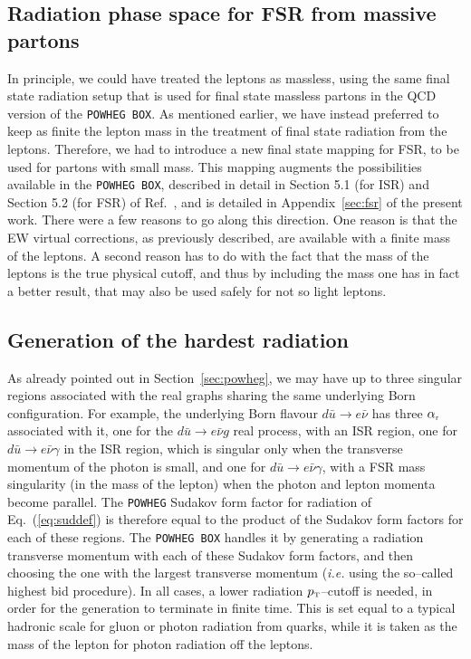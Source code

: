 \documentclass[11pt,a4paper]{article}
\newcommand\sss{\mathchoice%
{\displaystyle}%
{\scriptstyle}%
{\scriptscriptstyle}%
{\scriptscriptstyle}%
}
\newcommand\frindsing{{\ctindr}}
\newcommand\ctindr{{\alpha_{\sss\rm r}}}
\newcommand\pt{p_{\sss\rm T}}
\newcommand\POWHEGBOX{\texttt{POWHEG BOX}}
\newcommand\POWHEG{\texttt{POWHEG}}
\begin{document}
\subsection{Radiation phase space for FSR from massive partons}
\label{sec:fsrs}
In principle, we could have treated
the leptons as massless, using the same final state radiation
setup that is used for final state massless partons in the 
QCD version of the \POWHEGBOX{}. As mentioned earlier,
we have instead preferred to keep as finite the lepton mass in the 
treatment of final state
radiation from the leptons. Therefore, we had to introduce a new
final state mapping for FSR, to be used for 
partons with small mass. This mapping augments the possibilities
available in the \POWHEGBOX{}, described in detail in 
Section 5.1 (for ISR) and Section 5.2 (for FSR) of Ref.~\cite{Frixione:2007vw},
and is detailed in Appendix~\ref{sec:fsr} of the present work.
There were a few reasons to go along this direction. One reason
is that the EW virtual corrections, as previously described, are available with a finite mass of the
leptons. A second reason has to do with the fact
that the mass of the leptons is the true physical cutoff, and thus by
including the mass one has in fact a better result, that may
also be used safely for not so light leptons.
\subsection{Generation of the hardest radiation}
\label{sec:interface}
As already pointed out in Section~\ref{sec:powheg}, we may have up to three singular regions
associated with the real graphs sharing the same underlying
Born configuration. For example, the underlying Born flavour
$d\bar{u}\to e \bar\nu$ has three $\frindsing$ associated
with it, one for the $d\bar{u}\to e \bar\nu g$ real process,
with an ISR region, one for $d\bar{u}\to e \bar\nu \gamma$
in the ISR region, which is singular only when the transverse
momentum of the photon is small, and one for $d\bar{u}\to e \bar\nu \gamma$,
with a FSR mass singularity (in the mass of the lepton) when
the photon and lepton momenta become parallel.
The \POWHEG{} Sudakov form factor for radiation of Eq.~(\ref{eq:suddef}) is 
therefore equal to the product of the Sudakov form factors for each
of these regions.
The \POWHEGBOX{} handles it by generating
a radiation transverse momentum with each of these Sudakov form
factors, and then choosing the one with the largest transverse
momentum ({\it i.e.} using the so--called highest bid procedure).
In all cases, a lower radiation $\pt$--cutoff is needed, in
order for the generation to terminate in finite time.
This is set equal to a typical hadronic scale for gluon
or photon radiation from quarks, while it is taken as the
mass of the lepton for photon radiation off the leptons.
\end{document}
